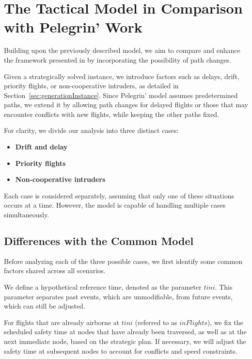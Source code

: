 \documentclass[../thesis.tex]{subfiles}
\begin{document}
\section{The Tactical Model in Comparison with Pelegrin' Work}  
\label{sec:MercedesModification}  

Building upon the previously described model, we aim to compare and enhance the framework presented in \cite{pelegrin-2023} by incorporating the possibility of path changes.  

Given a strategically solved instance, we introduce factors such as delays, drift, priority flights, or non-cooperative intruders, as detailed in Section~\ref{sec:generationInstance}. Since Pelegrin' model assumes predetermined paths, we extend it by allowing path changes for delayed flights or those that may encounter conflicts with new flights, while keeping the other paths fixed.  

For clarity, we divide our analysis into three distinct cases:  
\begin{itemize}
    \item \textbf{Drift and delay}  
    \item \textbf{Priority flights}  
    \item \textbf{Non-cooperative intruders}  
\end{itemize}

Each case is considered separately, assuming that only one of these situations occurs at a time. However, the model is capable of handling multiple cases simultaneously.

\subsection{Differences with the Common Model}  

Before analyzing each of the three possible cases, we first identify some common factors shared across all scenarios.  

We define a hypothetical reference time, denoted as the parameter $tini$. This parameter separates past events, which are unmodifiable, from future events, which can still be adjusted.  

For flights that are already airborne at $tini$ (referred to as $inFlights$), we fix the scheduled safety time at nodes that have already been traversed, as well as at the next immediate node, based on the strategic plan. If necessary, we will adjust the safety time at subsequent nodes to account for conflicts and speed constraints.
\end{document}
